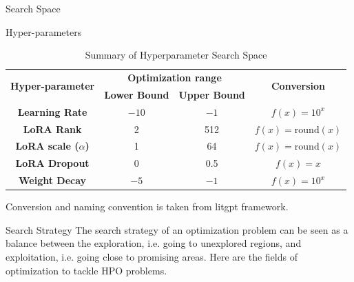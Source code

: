 \begin{frame}{Search Space}
    \begin{block}{Hyper-parameters}
    
        \begin{table}[h!]
            \centering
            \begin{tabular}{|c|c|c|c|}
                \hline
                \multirow{2}{*}{\textbf{Hyper-parameter}} & \multicolumn{2}{|c|}{\textbf{Optimization range}} & \multirow{2}{*}{\textbf{Conversion}} \\
                \cline{2-3}
                 & \textbf{Lower Bound} & \textbf{Upper Bound} &  \\
                \hline
                \textbf{Learning Rate} & $-10$ & $-1$ & $f(x) = 10^{x}$ \\
                \hline
                \textbf{LoRA Rank} & 2 & 512 & $f(x) = \text{round}(x)$ \\
                \hline
                \textbf{LoRA scale ($\alpha$)} & 1 & 64 & $f(x) = \text{round}(x)$ \\
                \hline
                \textbf{LoRA Dropout} & 0 & 0.5 & $f(x) = x$ \\
                \hline
                \textbf{Weight Decay} & $-5$ & $-1$ & $f(x) = 10^{x}$  \\
                \hline
            \end{tabular}
            \caption{Summary of Hyperparameter Search Space}
            \label{tab:hyperparam_table}
        \end{table}
        
    \end{block}
    
    Conversion and naming convention is taken from litgpt framework.
\end{frame}


\begin{frame}[allowframebreaks]{Search Strategy}
    The search strategy of an optimization problem can be seen as a balance between the exploration, i.e. going to unexplored regions, and exploitation, i.e. going close to promising areas. Here are the fields of optimization to tackle HPO problems.

\end{frame}

